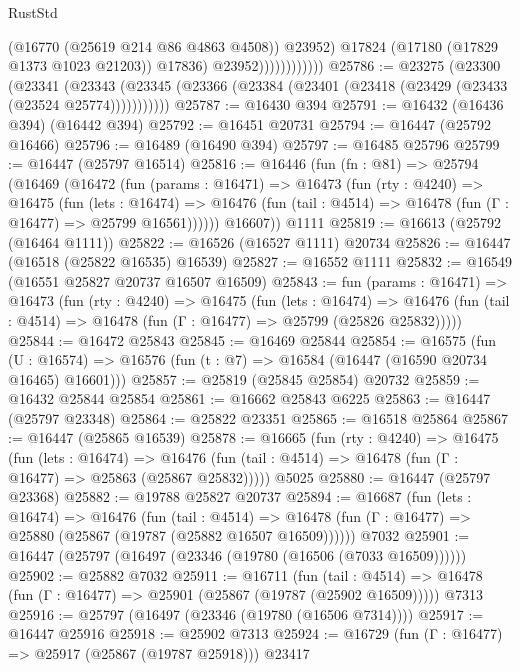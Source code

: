 \begin{lexlean}{RustStd}
\begin{coremodule}
{\begin{coremodule}
{{{{{{{{{{{{{{{{{{{{{{{{{{{{{{{{{{{{{{{{{{{{{{{{{{{{{{{                                (@16770 (@25619 @214 @86 @4863 @4508))
                                @23952)
                              @17824
                              (@17180 (@17829 @1373 @1023 @21203))
                              @17836)
                            @23952))))))))))))
@25786 := @23275
    (@23300
      (@23341
        (@23343 (@23345 (@23366 (@23384 (@23401 (@23418 (@23429 (@23433 (@23524 @25774)))))))))))
@25787 := @16430 @394
@25791 := @16432 (@16436 @394) (@16442 @394)
@25792 := @16451 @20731
@25794 := @16447 (@25792 @16466)
@25796 := @16489 (@16490 @394)
@25797 := @16485 @25796
@25799 := @16447 (@25797 @16514)
@25816 := @16446
    (fun (fn : @81) =>
    @25794
      (@16469
        (@16472
          (fun (params : @16471) =>
          @16473
            (fun (rty : @4240) =>
            @16475
              (fun (lets : @16474) =>
              @16476 (fun (tail : @4514) => @16478 (fun (Γ : @16477) => @25799 @16561))))))
        @16607))
    @1111
@25819 := @16613 (@25792 (@16464 @1111))
@25822 := @16526 (@16527 @1111) @20734
@25826 := @16447 (@16518 (@25822 @16535) @16539)
@25827 := @16552 @1111
@25832 := @16549 (@16551 @25827 @20737 @16507 @16509)
@25843 := fun (params : @16471) =>
  @16473
    (fun (rty : @4240) =>
    @16475
      (fun (lets : @16474) =>
      @16476 (fun (tail : @4514) => @16478 (fun (Γ : @16477) => @25799 (@25826 @25832)))))
@25844 := @16472 @25843
@25845 := @16469 @25844
@25854 := @16575
    (fun (U : @16574) => @16576 (fun (t : @7) => @16584 (@16447 (@16590 @20734 @16465) @16601)))
@25857 := @25819 (@25845 @25854) @20732
@25859 := @16432 @25844 @25854
@25861 := @16662 @25843 @6225
@25863 := @16447 (@25797 @23348)
@25864 := @25822 @23351
@25865 := @16518 @25864
@25867 := @16447 (@25865 @16539)
@25878 := @16665
    (fun (rty : @4240) =>
    @16475
      (fun (lets : @16474) =>
      @16476 (fun (tail : @4514) => @16478 (fun (Γ : @16477) => @25863 (@25867 @25832)))))
    @5025
@25880 := @16447 (@25797 @23368)
@25882 := @19788 @25827 @20737
@25894 := @16687
    (fun (lets : @16474) =>
    @16476
      (fun (tail : @4514) =>
      @16478 (fun (Γ : @16477) => @25880 (@25867 (@19787 (@25882 @16507 @16509))))))
    @7032
@25901 := @16447 (@25797 (@16497 (@23346 (@19780 (@16506 (@7033 @16509))))))
@25902 := @25882 @7032
@25911 := @16711
    (fun (tail : @4514) => @16478 (fun (Γ : @16477) => @25901 (@25867 (@19787 (@25902 @16509)))))
    @7313
@25916 := @25797 (@16497 (@23346 (@19780 (@16506 @7314))))
@25917 := @16447 @25916
@25918 := @25902 @7313
@25924 := @16729 (fun (Γ : @16477) => @25917 (@25867 (@19787 @25918))) @23417
}}}}}}}}}}}}}}}}}}}}}}}}}}}}}}}}}}}}}}}}}}}}}}}}}}}}}}}
\end{coremodule}}
\end{coremodule}
\end{lexlean}
